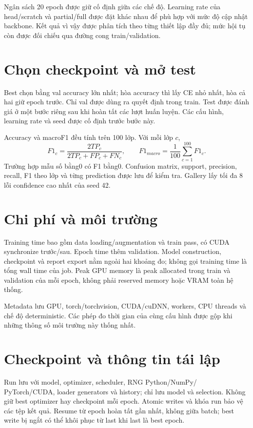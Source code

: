 \documentclass[12pt,a4paper]{report}
\numberwithin{equation}{chapter}
\newcommand{\code}[1]{\texttt{\detokenize{#1}}}
\begin{document}
Ngân sách 20 epoch được giữ cố định giữa các chế độ. Learning rate của
head/scratch và partial/full được đặt khác nhau để phù hợp với mức độ cập
nhật backbone. Kết quả vì vậy được phân tích theo từng thiết lập đầy đủ;
mức hội tụ còn được đối chiếu qua đường cong train/validation.

\section{Chọn checkpoint và mở test}
Best chọn bằng val accuracy lớn nhất; hòa accuracy thì lấy CE nhỏ nhất,
hòa cả hai giữ epoch trước. Chỉ val được dùng ra quyết định trong train.
Test được đánh giá ở một bước riêng sau khi hoàn tất các lượt huấn luyện.
Các cấu hình, learning rate và seed được cố định trước bước này.

Accuracy và macroF1 đều tính trên 100 lớp. Với mỗi lớp $c$,
\begin{equation}
F1_c=\frac{2TP_c}{2TP_c+FP_c+FN_c},\qquad
F1_{macro}=\frac1{100}\sum_{c=1}^{100}F1_c.
\end{equation}
Trường hợp mẫu số bằng0 có F1 bằng0. Confusion matrix, support, precision,
recall, F1 theo lớp và từng prediction được lưu để kiểm tra. Gallery lấy tối
đa 8 lỗi confidence cao nhất của seed 42.

\section{Chi phí và môi trường}
Training time bao gồm data loading/augmentation và train pass, có CUDA
synchronize trước/sau. Epoch time thêm validation. Model construction,
checkpoint và report export nằm ngoài hai khoảng đo; không gọi training time
là tổng wall time của job. Peak GPU memory là peak allocated trong train và
validation của mỗi epoch, không phải reserved memory hoặc VRAM toàn hệ thống.

Metadata lưu GPU, torch/torchvision, CUDA/cuDNN, workers, CPU threads và
chế độ deterministic. Các phép đo thời gian của cùng cấu hình được gộp khi
những thông số môi trường này thống nhất.

\section{Checkpoint và thông tin tái lập}
Run lưu \code{last.pt} với model, optimizer, scheduler, RNG Python/NumPy/
PyTorch/CUDA, loader generators và history; \code{best.pt} chỉ lưu model và
selection. Không giữ best optimizer hay checkpoint mỗi epoch. Atomic writes
và khóa run bảo vệ các tệp kết quả. Resume từ epoch hoàn tất gần nhất, không giữa
batch; best write bị ngắt có thể khôi phục từ last khi last là best epoch.
\end{document}
